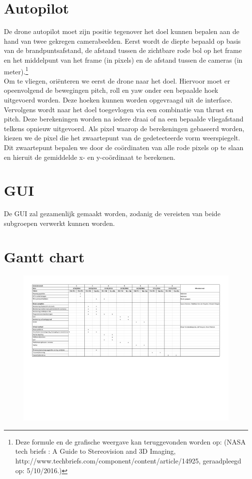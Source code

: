 \documentclass{peno-opdracht1}
\begin{document}
\section{Autopilot}
De drone autopilot moet zijn positie tegenover het doel kunnen bepalen aan de hand van twee gekregen camerabeelden. Eerst wordt de diepte bepaald op basis van de brandpuntsafstand, de afstand tussen de zichtbare rode bol op het frame en het middelpunt van het frame (in pixels) en de afstand tussen de camera\textquotesingle s (in meter).\footnote{Deze formule en de grafische weergave kan teruggevonden worden op: (NASA tech briefs : A Guide to Stereovision and 3D Imaging, http://www.techbriefs.com/component/content/article/14925, geraadpleegd op: 5/10/2016.)\label{refnote}}\\
Om te vliegen, ori\"enteren we eerst de drone naar het doel. Hiervoor moet er opeenvolgend de bewegingen pitch, roll en yaw onder een bepaalde hoek uitgevoerd worden. Deze hoeken kunnen worden opgevraagd uit de interface. Vervolgens wordt naar het doel toegevlogen via een combinatie van thrust en pitch.
Deze berekeningen worden na iedere draai of na een bepaalde vliegafstand telkens opnieuw uitgevoerd.
Als pixel waarop de berekeningen gebaseerd worden, kiezen we de pixel die het zwaartepunt van de gedetecteerde vorm weerspiegelt. Dit zwaartepunt bepalen we door de coördinaten van alle rode pixels op te slaan en hieruit de gemiddelde x- en y-co\"ordinaat te berekenen.

\section{GUI}
De GUI zal gezamenlijk gemaakt worden, zodanig de vereisten van beide subgroepen verwerkt kunnen worden. \\

\newpage
\appendix
\section{Gantt chart} \label{App:Planning}

\begin{figure}[h!]
	\begin{center}
		\includegraphics[angle=-90, scale = 0.7]{Planning.pdf}
	\end{center}
\end{figure}

\newpage
\end{document}
